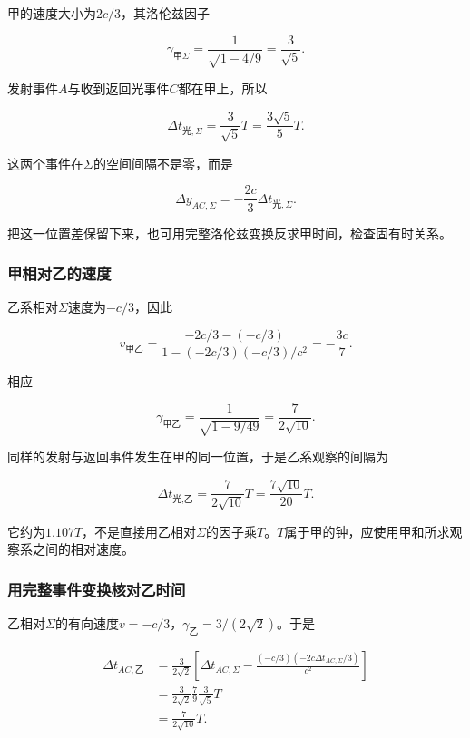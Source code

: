 \documentclass[12pt,a4paper,fontset=fandol]{ctexart}
\begin{document}
甲的速度大小为\(2c/3\)，其洛伦兹因子

\[
\gamma_{\text{甲}\Sigma}
=\frac1{\sqrt{1-4/9}}
=\frac3{\sqrt5}.
\]

发射事件\(A\)与收到返回光事件\(C\)都在甲上，所以

\[
\boxed{
\Delta t_{\text{光},\Sigma}
=\frac3{\sqrt5}T
=\frac{3\sqrt5}{5}T}.
\]

这两个事件在\(\Sigma\)的空间间隔不是零，而是

\[
\Delta y_{AC,\Sigma}
=-\frac{2c}{3}\Delta t_{\text{光},\Sigma}.
\]

把这一位置差保留下来，也可用完整洛伦兹变换反求甲时间，检查固有时关系。

\subsubsection{甲相对乙的速度}\label{ux7532ux76f8ux5bf9ux4e59ux7684ux901fux5ea6}

乙系相对\(\Sigma\)速度为\(-c/3\)，因此

\[
v_{\text{甲}\text{乙}}
=\frac{-2c/3-(-c/3)}
{1-(-2c/3)(-c/3)/c^2}
=\boxed{-\frac{3c}{7}}.
\]

相应

\[
\gamma_{\text{甲}\text{乙}}
=\frac1{\sqrt{1-9/49}}
=\frac7{2\sqrt{10}}.
\]

同样的发射与返回事件发生在甲的同一位置，于是乙系观察的间隔为

\[
\boxed{
\Delta t_{\text{光},\text{乙}}
=\frac7{2\sqrt{10}}T
=\frac{7\sqrt{10}}{20}T}.
\]

它约为\(1.107T\)，不是直接用乙相对\(\Sigma\)的因子乘\(T\)。\(T\)属于甲的钟，应使用甲和所求观察系之间的相对速度。

\subsubsection{用完整事件变换核对乙时间}\label{ux7528ux5b8cux6574ux4e8bux4ef6ux53d8ux6362ux6838ux5bf9ux4e59ux65f6ux95f4}

乙相对\(\Sigma\)的有向速度\(v=-c/3\)，\(\gamma_\text{乙}=3/(2\sqrt2)\)。于是

\[
\begin{aligned}
\Delta t_{AC,\text{乙}}
&=\frac3{2\sqrt2}
\left[
\Delta t_{AC,\Sigma}
-\frac{(-c/3)(-2c\Delta t_{AC,\Sigma}/3)}{c^2}
\right]\\
&=\frac3{2\sqrt2}\frac79\frac3{\sqrt5}T\\
&=\frac7{2\sqrt{10}}T.
\end{aligned}
\]
\end{document}
